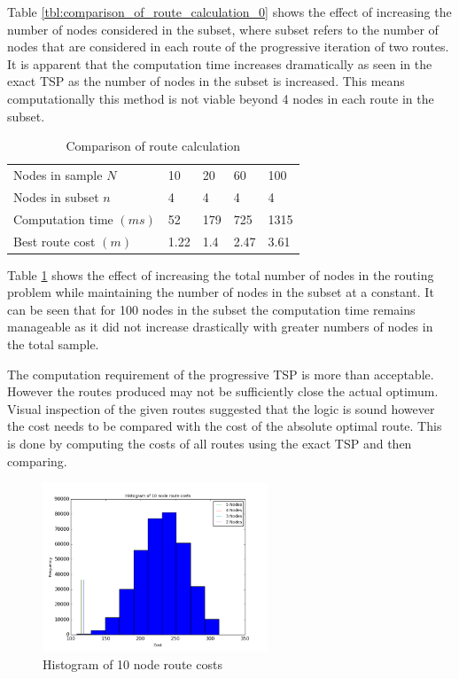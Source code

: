 \documentclass[a4paper,12pt,twoside]{article}
\begin{document}
Table \ref{tbl:comparison_of_route_calculation_0} shows the effect of increasing the number of nodes considered in the subset, where subset refers to the number of nodes that are considered in each route of the progressive iteration of two routes. It is apparent that the computation time increases dramatically as seen in the exact TSP as the number of nodes in the subset is increased. This means computationally this method is not viable beyond 4 nodes in each route in the subset.

\begin{table}[width=\textwidth]
\centering

    \begin{tabular}{lllll}
    Nodes in sample $N$	& 10	& 20	& 60	& 100	\\
Nodes in subset $n$	& 4	& 4	& 4	& 4	\\
Computation time $(ms)$	& 52	& 179	& 725	& 1315	\\
Best route cost $(m)$	& 1.22	& 1.4	& 2.47	& 3.61	\\

    \end{tabular}
\caption{Comparison of route calculation}
\label{tbl:comparison_of_route_calculation_1}
\end{table}

Table \ref{tbl:comparison_of_route_calculation_1} shows the effect of increasing the total number of nodes in the routing problem while maintaining the number of nodes in the subset at a constant. It can be seen that for 100 nodes in the subset the computation time remains manageable as it did not increase drastically with greater numbers of nodes in the total sample.

The computation requirement of the progressive TSP is more than acceptable. However the routes produced may not be sufficiently close the actual optimum. Visual inspection of the given routes suggested that the logic is sound however the cost needs to be compared with the cost of the absolute optimal route. This is done by computing the costs of all routes using the exact TSP and then comparing.

\begin{figure}
\centering
\includegraphics[width=0.6\textwidth]{figures/histogram_of_10_node_route_costs.png} 
\caption{Histogram of 10 node route costs}
\label{fig:histogram_of_10_node_route_costs}
\end{figure}
\end{document}

